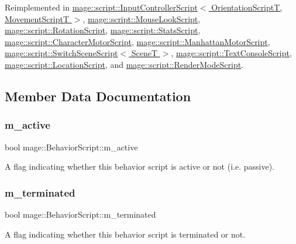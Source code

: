 Reimplemented in \hyperlink{classmage_1_1script_1_1_input_controller_script_ab013f70add87cec139fd72bb24af5846}{mage\+::script\+::\+Input\+Controller\+Script$<$ Orientation\+Script\+T, Movement\+Script\+T $>$}, \hyperlink{classmage_1_1script_1_1_mouse_look_script_a6d38748c21a6bc475e8ac31e24459053}{mage\+::script\+::\+Mouse\+Look\+Script}, \hyperlink{classmage_1_1script_1_1_rotation_script_a868768482599b478e8fd8afe371b6c54}{mage\+::script\+::\+Rotation\+Script}, \hyperlink{classmage_1_1script_1_1_stats_script_a0af94632cf9d5c32ae45799a2348c571}{mage\+::script\+::\+Stats\+Script}, \hyperlink{classmage_1_1script_1_1_character_motor_script_a75683c4b8db184174b48dd7e4989c016}{mage\+::script\+::\+Character\+Motor\+Script}, \hyperlink{classmage_1_1script_1_1_manhattan_motor_script_ae7fbaba1da04d00257e5d491868efc53}{mage\+::script\+::\+Manhattan\+Motor\+Script}, \hyperlink{classmage_1_1script_1_1_switch_scene_script_a4915aa35bad8aab3ba024f0babfe4933}{mage\+::script\+::\+Switch\+Scene\+Script$<$ Scene\+T $>$}, \hyperlink{classmage_1_1script_1_1_text_console_script_afc3d3099761c9c96b1a87ca07f06ddec}{mage\+::script\+::\+Text\+Console\+Script}, \hyperlink{classmage_1_1script_1_1_location_script_a039dc17396f2914e1ca043d8384b62da}{mage\+::script\+::\+Location\+Script}, and \hyperlink{classmage_1_1script_1_1_render_mode_script_afe0bfc54c414c2697dfd2babaccf3b51}{mage\+::script\+::\+Render\+Mode\+Script}.



\subsection{Member Data Documentation}
\hypertarget{classmage_1_1_behavior_script_a18f81792aed31a2d61a8a75784e2ceef}{}\label{classmage_1_1_behavior_script_a18f81792aed31a2d61a8a75784e2ceef} 
\subsubsection{\texorpdfstring{m\+\_\+active}{m\_active}}
{\footnotesize\ttfamily bool mage\+::\+Behavior\+Script\+::m\+\_\+active\hspace{0.3cm}{\ttfamily [private]}}

A flag indicating whether this behavior script is active or not (i.\+e. passive). \hypertarget{classmage_1_1_behavior_script_abc4a0e6728787347012404a597ab8e07}{}\label{classmage_1_1_behavior_script_abc4a0e6728787347012404a597ab8e07} 
\subsubsection{\texorpdfstring{m\+\_\+terminated}{m\_terminated}}
{\footnotesize\ttfamily bool mage\+::\+Behavior\+Script\+::m\+\_\+terminated\hspace{0.3cm}{\ttfamily [private]}}

A flag indicating whether this behavior script is terminated or not. 